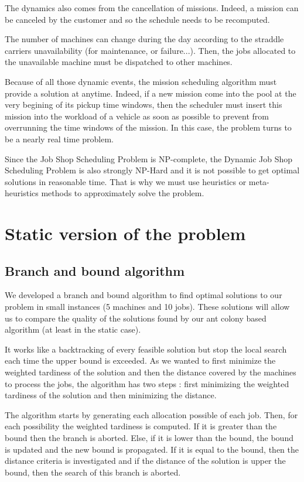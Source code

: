 \documentclass[a4paper,10pt]{article}
\begin{document}
The dynamics also comes from the cancellation of missions. Indeed, a mission can be canceled by the customer and so the schedule needs to be recomputed.

The number of machines can change during the day according to the straddle carriers unavailability (for maintenance, or failure...). Then, the jobs allocated to the unavailable machine must be dispatched to other machines.

Because of all those dynamic events, the mission scheduling algorithm must provide a solution at anytime. Indeed, if a new mission come into the pool at the very begining of its pickup time windows, then the scheduler must insert this mission into the workload of a vehicle as soon as possible to prevent from overrunning the time windows of the mission. In this case, the problem turns to be a nearly real time problem.

Since the Job Shop Scheduling Problem is NP-complete, the Dynamic Job Shop Scheduling Problem is also strongly NP-Hard and it is not possible to get optimal solutions in reasonable time. That is why we must use heuristics or meta-heuristics methods to approximately solve the problem.


   \section{Static version of the problem}

  \subsection{Branch and bound algorithm}
  We developed a branch and bound algorithm to find optimal solutions to our problem in small instances (5 machines and 10 jobs). These solutions will allow us to compare the quality of the solutions found by our ant colony based algorithm (at least in the static case).

  It works like a backtracking of every feasible solution but stop the local search each time the upper bound is exceeded. As we wanted to first minimize the weighted tardiness of the solution and then the distance covered by the machines to process the jobs, the algorithm has two steps : first minimizing the weighted tardiness of the solution and then minimizing the distance.

  The algorithm starts by generating each allocation possible of each job. Then, for each possibility the weighted tardiness is computed. If it is greater than the bound then the branch is aborted. Else, if it is lower than the bound, the bound is updated and the new bound is propagated. If it is equal to the bound, then the distance criteria is investigated and if the distance of the solution is upper the bound, then the search of this branch is aborted.
  
\end{document}
